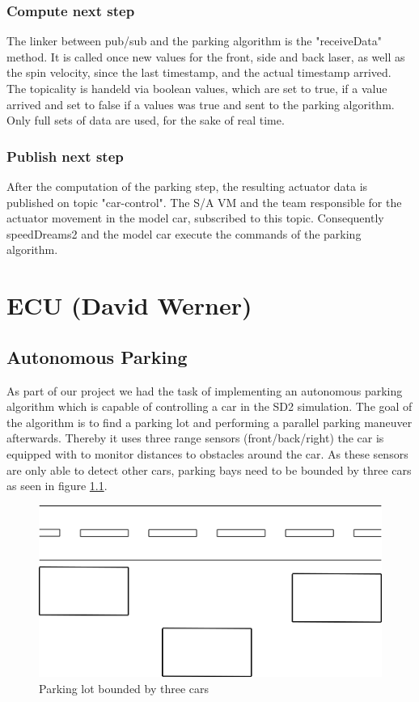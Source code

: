 \documentclass[paper=a4, fontsize=11pt]{scrreprt}
\begin{document}
  \subsection{Compute next step}
The linker between pub/sub and the parking algorithm is the "receiveData" method. It is called once new values for the front, side and back laser, as well as the spin velocity, since the last timestamp, and the actual timestamp arrived. The topicality is handeld via boolean values, which are set to true, if a value arrived and set to false if a values was true and sent to the parking algorithm. Only full sets of data are used, for the sake of real time.
  \subsection{Publish next step}
After the computation of the parking step, the resulting actuator data is published on topic "car-control". The S/A VM and the team responsible for the actuator movement in the model car, subscribed to this topic. Consequently speedDreams2 and the model car execute the commands of the parking algorithm.
\chapter{ECU (David Werner)}
\section{Autonomous Parking}
As part of our project we had the task of implementing an autonomous parking algorithm which is capable of controlling a car in the SD2 simulation. 
The goal of the algorithm is to find a parking lot and performing a parallel parking maneuver afterwards. Thereby it uses three range sensors (front/back/right) the car is equipped with to monitor distances to obstacles around the car. As these sensors are only able to detect other cars, parking bays need to be bounded by three cars as seen in figure \ref{parking_lot}.
\begin{figure}[H]
\centering
\includegraphics[scale=0.35]{images_ecu/parking_lot.png}
\caption{\tiny Parking lot bounded by three cars}
\label{parking_lot}
\end{figure}
\end{document}
